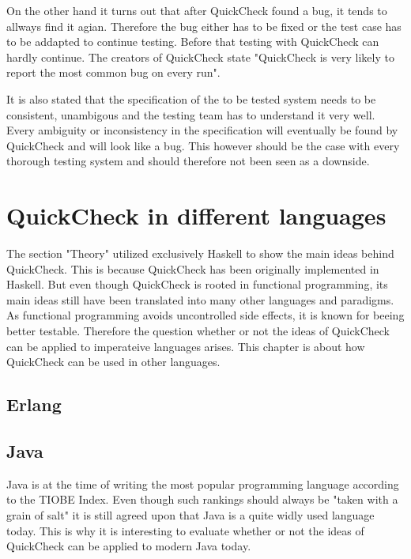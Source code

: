 \documentclass[a4paper, 12pt]{article} %
\begin{document}
On the other hand it turns out that after QuickCheck found a bug, it tends to allways find it agian. Therefore the bug either has to be fixed or the test case has to be addapted to continue testing. Before that testing with QuickCheck can hardly continue. The creators of QuickCheck state "QuickCheck is very likely to report the most common bug on every run". \cite{Arts06}

It is also stated that the specification of the to be tested system needs to be consistent, unambigous and the testing team has to understand it very well. Every ambiguity or inconsistency in the specification will eventually be found by QuickCheck and will look like a bug. This however should be the case with every thorough testing system and should therefore not been seen as a downside. \cite{Arts06}


\section{QuickCheck in different languages}


The section "Theory" utilized exclusively Haskell to show the main ideas behind QuickCheck. This is because QuickCheck has been originally implemented in Haskell. But even though QuickCheck is rooted in functional programming, its main ideas still have been translated into many other languages and paradigms. As functional programming avoids uncontrolled side effects, it is known for beeing better testable. Therefore the question whether or not the ideas of QuickCheck can be applied to imperateive languages arises. This chapter is about how QuickCheck can be used in other languages.

\subsection{Erlang}

\subsection{Java}

Java is at the time of writing the most popular programming language according to the TIOBE Index. \cite{tiobe2018} Even though such rankings should always be "taken with a grain of salt" it is still agreed upon that Java is a quite widly used language today. This is why it is interesting to evaluate whether or not the ideas of QuickCheck can be applied to modern Java today.
\end{document}

